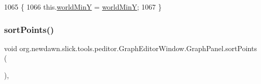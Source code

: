 \begin{DoxyCode}
1065                                                   \{
1066             this.\mbox{\hyperlink{classorg_1_1newdawn_1_1slick_1_1tools_1_1peditor_1_1_graph_editor_window_1_1_graph_panel_ad95df88110fd1b220a1fbe80850f84b4}{worldMinY}} = \mbox{\hyperlink{classorg_1_1newdawn_1_1slick_1_1tools_1_1peditor_1_1_graph_editor_window_1_1_graph_panel_ad95df88110fd1b220a1fbe80850f84b4}{worldMinY}};
1067         \}
\end{DoxyCode}
\mbox{\label{classorg_1_1newdawn_1_1slick_1_1tools_1_1peditor_1_1_graph_editor_window_1_1_graph_panel_a5ba3db2ef0241983db9623b2164bab0f}} 
\subsubsection{\texorpdfstring{sort\+Points()}{sortPoints()}}
{\footnotesize\ttfamily void org.\+newdawn.\+slick.\+tools.\+peditor.\+Graph\+Editor\+Window.\+Graph\+Panel.\+sort\+Points (\begin{DoxyParamCaption}{ }\end{DoxyParamCaption})\hspace{0.3cm}{\ttfamily [inline]}, {\ttfamily [private]}}

